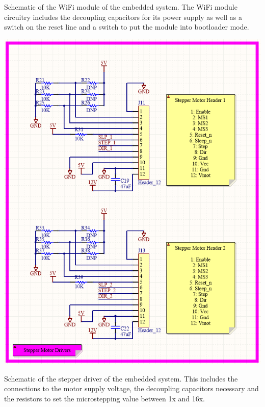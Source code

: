 \documentclass[12pt]{article}
\begin{document}
\begin{center}
Schematic of the WiFi module of the embedded system. The WiFi module circuitry includes the decoupling capacitors for its power supply as well as a switch on the reset line and a switch to put the module into bootloader mode.
\end{center}

\vspace*{5mm}

\vspace*{5mm}

\centerline{\includegraphics[scale=.75]{SchStepper}}

\begin{center}
Schematic of the stepper driver of the embedded system. This includes the connections to the motor supply voltage, the decoupling capacitors necessary and the resistors to set the microstepping value between 1x and 16x.
\end{center}

\vspace*{5mm}
\end{document}
